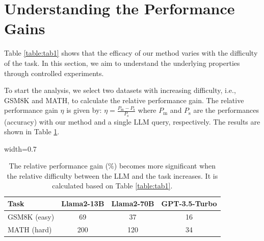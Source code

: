 \section{Understanding the Performance Gains}
\label{sec:analysis}

Table \ref{table:tab1} shows that the efficacy of our method varies with the difficulty of the task. In this section, we aim to understand the underlying properties through controlled experiments. 

To start the analysis, we select two datasets with increasing difficulty, i.e., GSM8K and MATH, to calculate the relative performance gain. 
The relative performance gain $\eta$ is given by: $\eta = \frac{P_{\text{m}} - P_{\text{s}}}{P_{\text{s}}}$ where $P_{\text{m}}$ and $P_{\text{s}}$ are the performances (accuracy) with our method and a single LLM query, respectively. 
The results are shown in Table \ref{table:analysis_exp}.

\begin{table}[ht!]
\caption{The relative performance gain ($\%$) becomes more significant when the relative difficulty between the LLM and the task increases. It is calculated based on Table \ref{table:tab1}.}
\label{table:analysis_exp}
\begin{center}
\begin{small}
\begin{adjustbox}{width=0.7\linewidth}
\begin{tabular}{lccc}
\toprule
\textbf{Task}      & \textbf{Llama2-13B} & \textbf{Llama2-70B} & \textbf{GPT-3.5-Turbo}   \\
\midrule
GSM8K (easy)     & 69  & 37  & 16         \\
MATH (hard)      & 200         & 120  & 34      \\

\bottomrule
\end{tabular}
\end{adjustbox}
\end{small}
\end{center}
\end{table}


